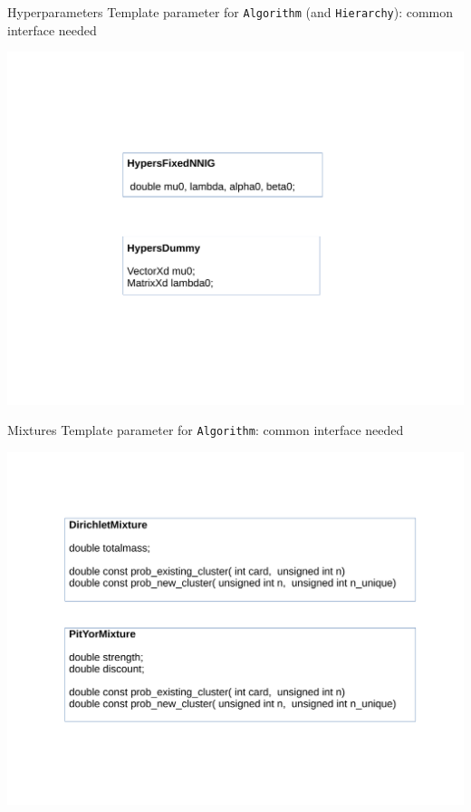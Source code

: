 \begin{frame}{Hyperparameters}
Template parameter for \texttt{Algorithm} (and \texttt{Hierarchy}): common interface needed
\begin{center}
	\includegraphics[scale=0.35]{etc/hypers.pdf}
\end{center}
\end{frame}

\begin{frame}{Mixtures}
Template parameter for \texttt{Algorithm}: common interface needed
\begin{center}
	\includegraphics[scale=0.35]{etc/mixture.pdf}
\end{center}

\end{frame}